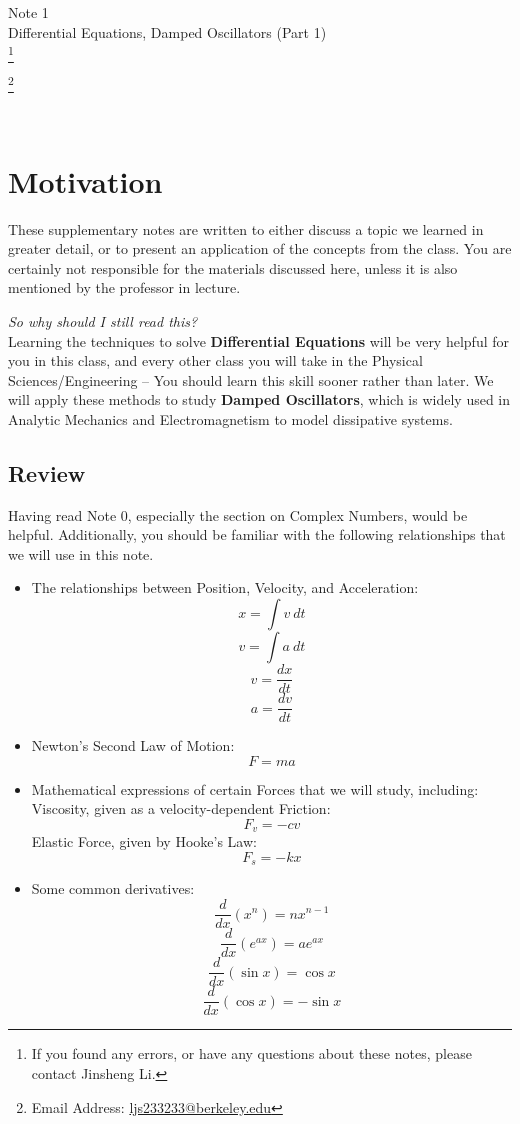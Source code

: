 \documentclass[11pt]{article}
\newcommand\blfootnote[1]{
    \begingroup
    \renewcommand\thefootnote{}\footnote{#1}
    \addtocounter{footnote}{-1}
    \endgroup
}
\theoremstyle{gangnamstyle}{\newtheorem{definition}{Definition}[]}
\theoremstyle{gangnamstyle}{\newtheorem{example}{Example}[]}
\theoremstyle{gangnamstyle}{\newtheorem{problem}{Problem}[]}
\theoremstyle{gangnamstyle}{\newtheorem{warning}{Warning}[]}
\begin{document}
\normalfont
\pagestyle{pages}


\begin{center}
\vspace{3in}
{\Large Note 1 } \\[0.05in]
Differential Equations, Damped Oscillators (Part 1)  \\ 
\blfootnote{If you found any errors, or have any questions about these notes, please contact Jinsheng Li.} \blfootnote{Email Address: \href{mailto:ljs233233@berkeley.edu}{ljs233233@berkeley.edu}} \\ [-0.5in]
\end{center}

\section*{Motivation}

These supplementary notes are written to either discuss a topic we learned in greater detail, or to present an application of the concepts from the class. You are certainly not responsible for the materials discussed here, unless it is also mentioned by the professor in lecture. 

\textit{So why should I still read this?} \\
Learning the techniques to solve \textbf{Differential Equations} will be very helpful for you in this class, and every other class you will take in the Physical Sciences/Engineering -- You should learn this skill sooner rather than later. We will apply these methods to study \textbf{Damped Oscillators}, which is widely used in Analytic Mechanics and Electromagnetism to model dissipative systems. 

\subsection*{Review}

Having read Note 0, especially the section on Complex Numbers, would be helpful. Additionally, you should be familiar with the following relationships that we will use in this note. 

\begin{itemize}
\item The relationships between Position, Velocity, and Acceleration: 
\[ x = \int v \ dt \]
\[ v = \int a \ dt \]
\[ v = \frac{dx}{dt}\]
\[ a = \frac{dv}{dt} \]
\item Newton's Second Law of Motion: 
\[ F = ma \]
\item Mathematical expressions of certain Forces that we will study, including: \\
Viscosity, given as a velocity-dependent Friction: 
\[ F_v = -cv \]
Elastic Force, given by Hooke's Law: 
\[ F_s = -kx \]
\item Some common derivatives: 
\[ \frac{d}{dx}(x^n) = nx^{n - 1} \]
\[ \frac{d}{dx}(e^{ax}) = ae^{ax} \]
\[ \frac{d}{dx}(\sin x) = \cos x \]
\[ \frac{d}{dx}(\cos x) = -\sin x \]
\end{itemize}
\pagebreak
\end{document}

